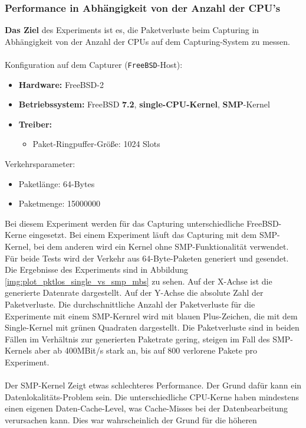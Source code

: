 \subsubsection*{Performance in Abhängigkeit von der Anzahl der CPU's}
\textbf{Das Ziel} des Experiments ist es, die Paketverluste beim Capturing 
in Abhängigkeit von der Anzahl der CPUs auf dem Capturing-System zu messen.\\\\
%
Konfiguration auf dem Capturer (\verb+FreeBSD+-Host): 
\begin{itemize}
	\item \textbf{Hardware:} FreeBSD-2	
	\item \textbf{Betriebssystem:} FreeBSD \textbf{7.2}, \textbf{single-CPU-Kernel}, \textbf{SMP}-Kernel
	\item \textbf{Treiber:} 
		\begin{itemize}
			\item Paket-Ringpuffer-Größe: 1024 Slots
		\end{itemize}
\end{itemize}
Verkehrsparameter:
\begin{itemize}
	\item Paketlänge: 64-Bytes
	\item Paketmenge: 15000000
\end{itemize}
%
Bei diesem Experiment werden für das Capturing unterschiedliche FreeBSD-Kerne
eingesetzt.  Bei einem Experiment läuft das Capturing mit dem SMP-Kernel, bei
dem anderen wird ein Kernel ohne SMP-Funktionalität verwendet. Für beide Tests
wird der Verkehr aus 64-Byte-Paketen generiert und gesendet. Die Ergebnisse des
Experiments sind in Abbildung \ref{img:plot_pktlos_single_vs_smp_mbs} zu sehen.
Auf der X-Achse ist die generierte Datenrate dargestellt. Auf der Y-Achse die
absolute Zahl der Paketverluste. Die durchschnittliche Anzahl der Paketverluste
für die Experimente mit einem SMP-Kernrel wird mit blauen Plus-Zeichen, die mit
dem Single-Kernel mit grünen Quadraten dargestellt. Die Paketverluste sind in
beiden Fällen im Verhältnis zur generierten Paketrate gering, steigen im Fall
des SMP-Kernels aber ab 400MBit/s stark an, bis auf 800 verlorene Pakete pro
Experiment.\\\\ 
%
Der SMP-Kernel Zeigt etwas schlechteres Performance. Der Grund dafür kann ein
Datenlokalitäts-Problem sein. Die unterschiedliche CPU-Kerne haben mindestens
einen eigenen Daten-Cache-Level, was Cache-Misses bei der Datenbearbeitung
verursachen kann. Dies war wahrscheinlich der Grund für die höheren
